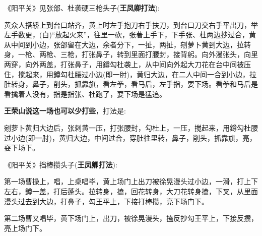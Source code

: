 《阳平关》见张郃、杜袭硬三枪头子({\bfseries\hwfs 王凤卿打法}):~

黄众人搭轿上到台口站齐，黄上时左手抱刀右手扶刀，到台口刀交右手平出刀，举左手数更，({\akai 白})``放起火来''，往里一砍，张著上手下，下手张、杜两边抄过合，黄从中间到小边，张郃留在大边，余者分下，一扯，两扯，剜萝卜黄到大边，拉转身，一枪、两枪、三枪，打张鼻子，转到里面打腰封，接背躬。向外漫张头，向里两穿，向外两盖，打张鼻子，用鐏勾杜袭上，从中间向外起大刀花在台中间被压住，搅起来，用鐏勾杜腰过小边(即一肘)，黄归大边，在二人中间一合到小边，拉肚转身，鼻子，削头，抓靠旗，看左拳，看马后，左手指，耍下场。看拳和马后是看擒着人没有，指是指张、杜跑了，耍下场是猛追。

{\bfseries\hwfs 王荣山说这一场也可以少打些}，打法是:~

剜萝卜黄归大边后，张刺黄一压，打张腰封，勾杜上，一压，搅起来，用鐏勾杜腰过小边(即一肘)，黄归大边，中间过合，穿肚往里转，鼻子，削头，抓靠旗，亮，耍下场下。

《阳平关》挡棒攒头子({\bfseries\hwfs 王凤卿打法}):~

第一场曹操上，唱，上桌唱毕，黄上场门上出刀被徐晃漫头过小边，一滑，打上下左右，鐏一盖，打后蓬头。拉转身，搕，回花转身，大刀花转身搕，下叉，从里面漫头过去到大边，打鼻子，勾王平上，下接打棒攒，亮下场门下。

第二场曹又唱毕，黄下场门上，出刀，被徐晃漫头，搕反抄勾王平上，下接反攒，亮上场门下。

